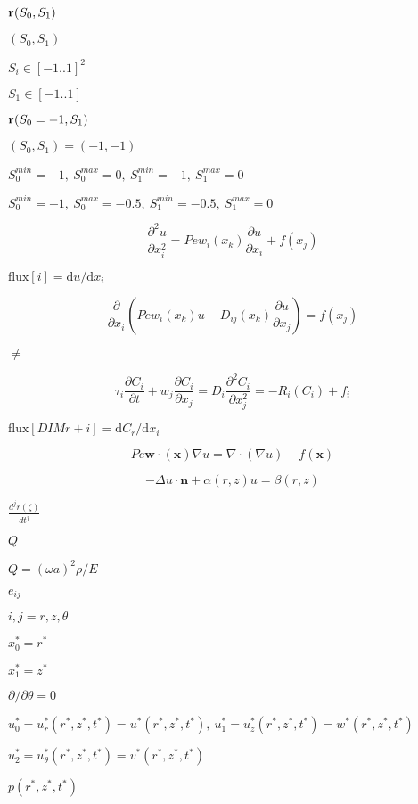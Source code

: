 \documentclass{article}
\begin{document}
$ {\bf r}(S_0,S_1) $
\pagebreak

$ (S_0, S_1) $
\pagebreak

$ S_i \in [-1..1]^2 $
\pagebreak

$ S_1\in [-1..1]$
\pagebreak

$ {\bf r}(S_0=-1,S_1) $
\pagebreak

$(S_0,S_1)=(-1,-1)$
\pagebreak

$ S_0^{min}=-1, \  S_0^{max}=0, \ S_1^{min}=-1, \  S_1^{max}=0 $
\pagebreak

$ S_0^{min}=-1, \  S_0^{max}=-0.5,
   \ S_1^{min}=-0.5, \  S_1^{max}=0 $
\pagebreak

\[ \frac{\partial^2 u}{\partial x_i^2} = Pe w_i(x_k) \frac{\partial u}{\partial x_i} + f(x_j) \]
\pagebreak

$\mbox{flux}[i] = \mbox{d}u / \mbox{d}x_i $
\pagebreak

\[ \frac{\partial}{\partial x_{i}}\left( Pe w_{i}(x_{k}) u - D_{ij}(x_{k})\frac{\partial u}{\partial x_{j}}\right) = f(x_{j}) \]
\pagebreak

$ \ne $
\pagebreak

\[ \tau_{i} \frac{\partial C_{i}}{\partial t} + w_{j} \frac{\partial C_{i}}{\partial x_{j}} = D_{i}\frac{\partial^2 C_{i}}{\partial x_j^2} = - R_{i}(C_{i}) + f_{i} \]
\pagebreak

$\mbox{flux}[DIM r + i] = \mbox{d}C_{r} / \mbox{d}x_i $
\pagebreak

\[ Pe \mathbf{w}\cdot(\mathbf{x}) \nabla u = \nabla \cdot \left( \nabla u \right) + f(\mathbf{x}) \]
\pagebreak

\[ -\Delta u \cdot \mathbf{n} + \alpha(r,z) u = \beta(r,z) \]
\pagebreak

$ \frac{d^{j} r(\zeta)}{dt^j} $
\pagebreak

$ Q $
\pagebreak

$ Q = (\omega a)^2 \rho/E $
\pagebreak

$ e_{ij} $
\pagebreak

$ i,j = r,z,\theta $
\pagebreak

$ x_0^* = r^*$
\pagebreak

$ x_1^* = z^* $
\pagebreak

$ \partial / \partial \theta = 0 $
\pagebreak

$ u_0^* = u_r^*(r^*,z^*,t^*) = u^*(r^*,z^*,t^*), \ u_1^* = u_z^*(r^*,z^*,t^*) = w^*(r^*,z^*,t^*)$
\pagebreak

$ u_2^* = u_\theta^*(r^*,z^*,t^*) = v^*(r^*,z^*,t^*) $
\pagebreak

$ p(r^*,z^*,t^*) $
\pagebreak
\end{document}
